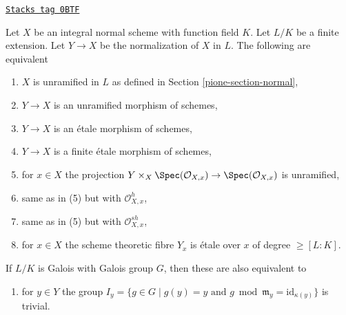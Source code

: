 \begin{lemma}[Unramified]
\label{pione-lemma-unramified}
\href{https://stacks.math.columbia.edu/tag/0BTF}{\texttt{Stacks tag 0BTF}}

Let $X$ be an integral normal scheme with function field $K$.
Let $L/K$ be a finite extension. Let $Y \to X$ be the normalization
of $X$ in $L$. The following are equivalent
\begin{enumerate}
\item $X$ is unramified in $L$ as defined in Section \ref{pione-section-normal},
\item $Y \to X$ is an unramified morphism of schemes,
\item $Y \to X$ is an \'etale morphism of schemes,
\item $Y \to X$ is a finite \'etale morphism of schemes,
\item for $x \in X$ the projection
$Y \times_X \Spec(\mathcal{O}_{X, x}) \to \Spec(\mathcal{O}_{X, x})$
is unramified,
\item same as in (5) but with $\mathcal{O}_{X, x}^h$,
\item same as in (5) but with $\mathcal{O}_{X, x}^{sh}$,
\item for $x \in X$ the scheme theoretic fibre $Y_x$
is \'etale over $x$ of degree $\geq [L : K]$.
\end{enumerate}
If $L/K$ is Galois with Galois group $G$, then these are also
equivalent to
\begin{enumerate}
\item[(9)] for $y \in Y$ the group
$I_y = \{g \in G \mid g(y) = y\text{ and }
g \bmod \mathfrak m_y = \text{id}_{\kappa(y)}\}$ is trivial.
\end{enumerate}
\end{lemma}

